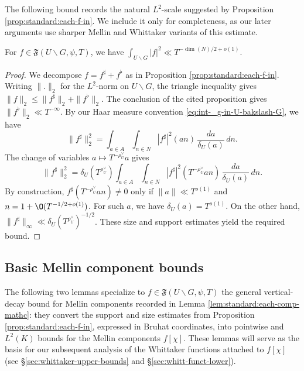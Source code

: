 The following bound records the natural $L^2$-scale suggested by Proposition \ref{prop:standard:each-f-in}.  We include it only for completeness, as our later arguments use sharper Mellin and Whittaker variants of this estimate.
\begin{lemma}
  For $f \in \mathfrak{F}(U \backslash G, \psi, T)$, we have $\int_{U \backslash G} |f|^2 \ll T^{-\dim(N)/2 + o(1)}$.
\end{lemma}
\begin{proof}
  We decompose $f = f^\sharp + f^\flat$ as in Proposition \ref{prop:standard:each-f-in}.  Writing $\|.\|_2$ for the $L^2$-norm on $U \backslash G$, the triangle inequality gives $\|f\|_2 \leq \|f^\sharp \|_2 + \|f^\flat \|_2$.  The conclusion of the cited proposition gives $\|f^\flat \|_2 \ll T^{-\infty}$.  By our Haar measure convention \eqref{eq:int-_g-in-U-bakslash-G}, we have
  \begin{equation*}
    \|f^\sharp \|_2^2
    =
    \int_{a \in A}
    \int_{n \in N}
    |f^\sharp|^2 (a n) \, \frac{d a }{ \delta_U(a)} \, d n.
  \end{equation*}
  The change of variables $a \mapsto T^{-\rho_U^\vee} a$ gives
  \begin{equation*}
    \|f^\sharp \|_2^2
    =
    \delta_U(T^{\rho_U^\vee})
    \int_{a \in A}
    \int_{n \in N}
    |f^\sharp|^2 (T^{-\rho_U^\vee} a n) \, \frac{d a }{ \delta_U(a)} \, d n.
  \end{equation*}
  By construction, $f^\sharp (T^{- \rho_U^\vee } a n ) \neq 0$ only if $\|a\| \ll T^{o(1)}$ and $n = 1 + \O(T^{-1/2+o(1)})$.  For such $a$, we have $\delta_U(a) = T^{o(1)}$.  On the other hand, $\|f^\sharp \|  _\infty \ll \delta_U(T^{\rho_U^\vee})^{-1/2}$.  These size and support estimates yield the required bound.
\end{proof}

\subsection{Basic Mellin component bounds}

The following two lemmas specialize to $f \in \mathfrak{F}(U \backslash G,\psi,T)$ the general vertical-decay bound for Mellin components recorded in Lemma \ref{lem:standard:each-comp-mathc}: they convert the support and size estimates from Proposition \ref{prop:standard:each-f-in}, expressed in Bruhat coordinates, into pointwise and $L^2(K)$ bounds for the Mellin components $f[\chi]$.  These lemmas will serve as the basis for our subsequent analysis of the Whittaker functions attached to $f[\chi]$ (see \S\ref{sec:whittaker-upper-bounds} and \S\ref{sec:whitt-funct-lower}).


